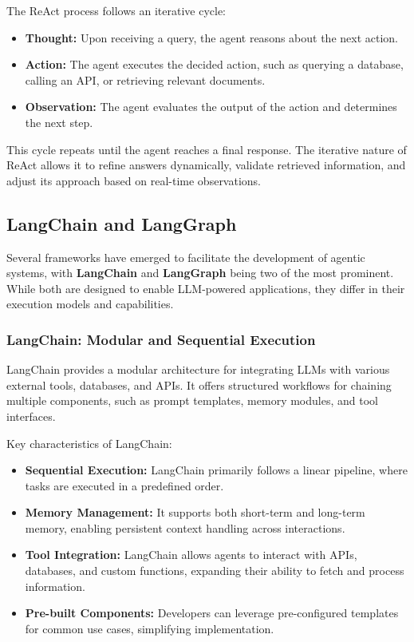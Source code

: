 The ReAct process follows an iterative cycle:

\begin{itemize}
    \item \textbf{Thought:} Upon receiving a query, the agent reasons about the next action.
    \item \textbf{Action:} The agent executes the decided action, such as querying a database, calling an API, or retrieving relevant documents.
    \item \textbf{Observation:} The agent evaluates the output of the action and determines the next step.
\end{itemize}

This cycle repeats until the agent reaches a final response. The iterative nature of ReAct allows it to refine answers dynamically, validate retrieved information, and adjust its approach based on real-time observations.

\subsection{LangChain and LangGraph}

Several frameworks have emerged to facilitate the development of agentic systems, with \textbf{LangChain} and \textbf{LangGraph} being two of the most prominent. While both are designed to enable LLM-powered applications, they differ in their execution models and capabilities.

\subsubsection{LangChain: Modular and Sequential Execution}

LangChain provides a modular architecture for integrating LLMs with various external tools, databases, and APIs. It offers structured workflows for chaining multiple components, such as prompt templates, memory modules, and tool interfaces.

Key characteristics of LangChain:
\begin{itemize}
    \item \textbf{Sequential Execution:} LangChain primarily follows a linear pipeline, where tasks are executed in a predefined order.
    \item \textbf{Memory Management:} It supports both short-term and long-term memory, enabling persistent context handling across interactions.
    \item \textbf{Tool Integration:} LangChain allows agents to interact with APIs, databases, and custom functions, expanding their ability to fetch and process information.
    \item \textbf{Pre-built Components:} Developers can leverage pre-configured templates for common use cases, simplifying implementation.
\end{itemize}


